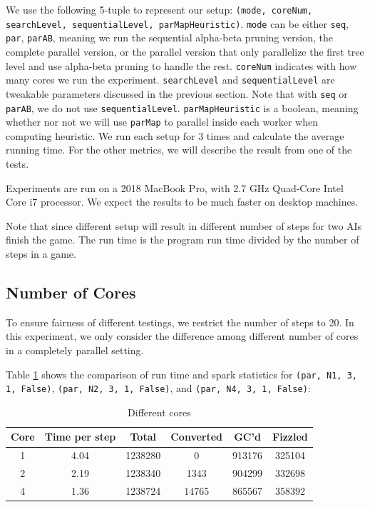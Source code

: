 \documentclass[twoside,11pt]{homework}
\begin{document}
We use the following 5-tuple to represent our setup: \texttt{(mode, coreNum, searchLevel, sequentialLevel, parMapHeuristic)}. \texttt{mode} can be either \texttt{seq}, \texttt{par}, \texttt{parAB}, meaning we run the sequential alpha-beta pruning version, the complete parallel version, or the parallel version that only parallelize the first tree level and use alpha-beta pruning to handle the rest. \texttt{coreNum} indicates with how many cores we run the experiment. \texttt{searchLevel} and \texttt{sequentialLevel} are tweakable parameters discussed in the previous section. Note that with \texttt{seq} or \texttt{parAB}, we do not use \texttt{sequentialLevel}. \texttt{parMapHeuristic} is a boolean, meaning whether nor not we will use \texttt{parMap} to parallel inside each worker when computing heuristic. We run each setup for 3 times and calculate the average running time. For the other metrics, we will describe the result from one of the tests.

Experiments are run on a 2018 MacBook Pro, with 2.7 GHz Quad-Core Intel Core i7 processor. We expect the results to be much faster on desktop machines.

Note that since different setup will result in different number of steps for two AIs finish the game. The run time is the program run time divided by the number of steps in a game.

\subsection{Number of Cores}
To ensure fairness of different testings, we restrict the number of steps to 20. In this experiment, we only consider the difference among different number of cores in a completely parallel setting.

Table \ref{diff-cores} shows the comparison of run time and spark statistics for \texttt{(par, N1, 3, 1, False)}, \texttt{(par, N2, 3, 1, False)}, and \texttt{(par, N4, 3, 1, False)}:

\begin{table}[h!]
\centering
\begin{tabular}{||c c c c c c||} 
 \hline
 Core & Time per step & Total & Converted & GC'd & Fizzled \\ [0.5ex] 
 \hline\hline
 1 & 4.04 & 1238280 & 0 & 913176 & 325104 \\ 
 2 & 2.19 & 1238340 & 1343 & 904299 & 332698 \\
 4 & 1.36 & 1238724 & 14765 & 865567 & 358392 \\ [1ex] 
 \hline
\end{tabular}
\caption{Different cores}
\label{diff-cores}
\end{table}
\end{document}

